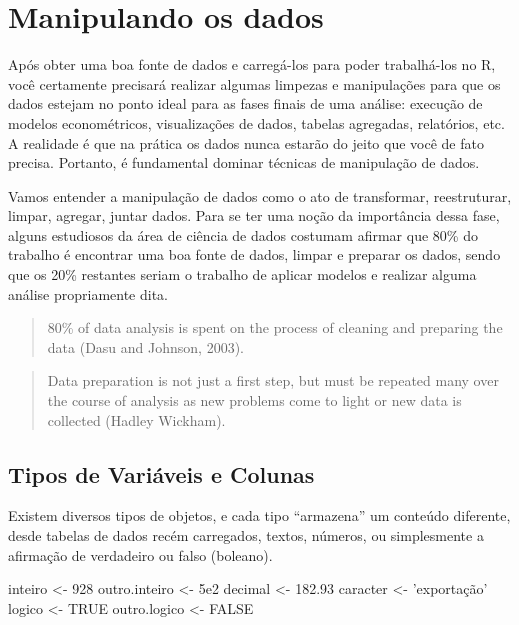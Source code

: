 \documentclass[]{book}
\newenvironment{Shaded}{\begin{snugshade}}{\end{snugshade}}
\newcommand{\DecValTok}[1]{\textcolor[rgb]{0.00,0.00,0.81}{#1}}
\newcommand{\FloatTok}[1]{\textcolor[rgb]{0.00,0.00,0.81}{#1}}
\newcommand{\StringTok}[1]{\textcolor[rgb]{0.31,0.60,0.02}{#1}}
\newcommand{\OtherTok}[1]{\textcolor[rgb]{0.56,0.35,0.01}{#1}}
\newcommand{\NormalTok}[1]{#1}
\begin{document}
\chapter{Manipulando os dados}\label{manipulando-os-dados}

Após obter uma boa fonte de dados e carregá-los para poder trabalhá-los
no R, você certamente precisará realizar algumas limpezas e manipulações
para que os dados estejam no ponto ideal para as fases finais de uma
análise: execução de modelos econométricos, visualizações de dados,
tabelas agregadas, relatórios, etc. A realidade é que na prática os
dados nunca estarão do jeito que você de fato precisa. Portanto, é
fundamental dominar técnicas de manipulação de dados.

Vamos entender a manipulação de dados como o ato de transformar,
reestruturar, limpar, agregar, juntar dados. Para se ter uma noção da
importância dessa fase, alguns estudiosos da área de ciência de dados
costumam afirmar que 80\% do trabalho é encontrar uma boa fonte de
dados, limpar e preparar os dados, sendo que os 20\% restantes seriam o
trabalho de aplicar modelos e realizar alguma análise propriamente dita.

\begin{quote}
80\% of data analysis is spent on the process of cleaning and preparing
the data (Dasu and Johnson, 2003).
\end{quote}

\begin{quote}
Data preparation is not just a first step, but must be repeated many
over the course of analysis as new problems come to light or new data is
collected (Hadley Wickham).
\end{quote}

\section{Tipos de Variáveis e
Colunas}\label{tipos-de-variaveis-e-colunas}

Existem diversos tipos de objetos, e cada tipo ``armazena'' um conteúdo
diferente, desde tabelas de dados recém carregados, textos, números, ou
simplesmente a afirmação de verdadeiro ou falso (boleano).

\begin{Shaded}
\begin{Highlighting}[]
\NormalTok{inteiro <-}\StringTok{ }\DecValTok{928}
\NormalTok{outro.inteiro <-}\StringTok{ }\FloatTok{5e2}
\NormalTok{decimal <-}\StringTok{ }\FloatTok{182.93}
\NormalTok{caracter <-}\StringTok{ 'exportação'}
\NormalTok{logico <-}\StringTok{ }\OtherTok{TRUE}
\NormalTok{outro.logico <-}\StringTok{ }\OtherTok{FALSE}
\end{Highlighting}
\end{Shaded}
\end{document}
